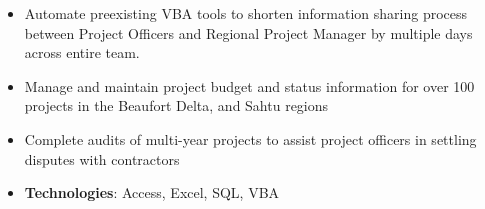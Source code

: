 \documentclass[10pt, letterpaper, ragged2e, withhyper]{altacv}
\begin{document}
\begin{paracol}{2}
    \divider

            \begin{itemize}
                \item Automate preexisting VBA tools to shorten information sharing process between Project Officers and Regional Project Manager by multiple days across entire team.
                \item Manage and maintain project budget and status information for over 100 projects in the Beaufort Delta, and Sahtu regions  
                \item Complete audits of multi-year projects to assist project officers in settling disputes with contractors 
                \item \textbf{Technologies}: Access, Excel, SQL, VBA 
            \end{itemize}

            

            

\end{paracol}
\end{document}
